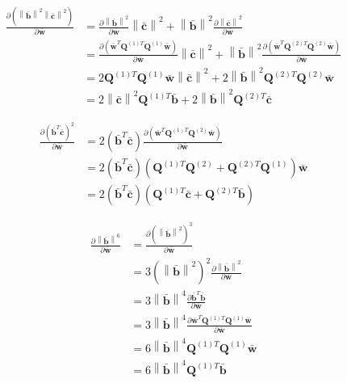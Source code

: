 \begin{align}
\frac{
\partial 
\left(
\left\|\mathbf{\bar{b}}\right\|^2
\left\|\mathbf{\bar{c}}\right\|^2
\right)
}
{\partial \mathbf{\bar{w}}}
&=
\frac{
\partial 
\left\|\mathbf{\bar{b}}\right\|^2
}
{\partial \mathbf{\bar{w}}}
\left\|\mathbf{\bar{c}}\right\|^2
+
\left\|\mathbf{\bar{b}}\right\|^2
\frac{
\partial 
\left\|\mathbf{\bar{c}}\right\|^2
}
{\partial \mathbf{\bar{w}}}\\
~
&=
\frac{
\partial 
\left(
\mathbf{\bar{w}}^{T} \mathbf{Q}^{(1)T}
\mathbf{Q}^{(1)} \mathbf{\bar{w}}
\right)
}
{\partial \mathbf{\bar{w}}}
\left\|\mathbf{\bar{c}}\right\|^2
+
\left\|\mathbf{\bar{b}}\right\|^2
\frac{
\partial 
\left(
\mathbf{\bar{w}}^{T} \mathbf{Q}^{(2)T}
\mathbf{Q}^{(2)} \mathbf{\bar{w}}
\right)
}
{\partial \mathbf{\bar{w}}}\\
~
&=
2
\mathbf{Q}^{(1)T} \mathbf{Q}^{(1)} \mathbf{\bar{w}}
\left\|\mathbf{\bar{c}}\right\|^2
+
2
\left\|\mathbf{\bar{b}}\right\|^2
\mathbf{Q}^{(2)T} \mathbf{Q}^{(2)} \mathbf{\bar{w}}\\
~
&=
2
\left\|\mathbf{\bar{c}}\right\|^2
\mathbf{Q}^{(1)T} \mathbf{\bar{b}}
+
2
\left\|\mathbf{\bar{b}}\right\|^2
\mathbf{Q}^{(2)T} \mathbf{\bar{c}}
\end{align}

\begin{align}
\frac{
\partial
\left(
\mathbf{\bar{b}}^{T}
\mathbf{\bar{c}}
\right)^{2}
}
{\partial \mathbf{\bar{w}}} 
&=
2
\left(
\mathbf{\bar{b}}^{T}
\mathbf{\bar{c}}
\right)
\frac{
\partial
\left(
\mathbf{\bar{w}}^{T} \mathbf{Q}^{(1)T}
\mathbf{Q}^{(2)} \mathbf{\bar{w}}
\right)
}
{\partial \mathbf{\bar{w}}}\\
~
&=
2
\left(
\mathbf{\bar{b}}^{T}
\mathbf{\bar{c}}
\right)
\left(
\mathbf{Q}^{(1)T}\mathbf{Q}^{(2)}
+
\mathbf{Q}^{(2)T}\mathbf{Q}^{(1)}
\right)
\mathbf{\bar{w}}\\
~
&=
2
\left(
\mathbf{\bar{b}}^{T}
\mathbf{\bar{c}}
\right)
\left(
\mathbf{Q}^{(1)T}\mathbf{\bar{c}}
+
\mathbf{Q}^{(2)T}\mathbf{\bar{b}}
\right)
\end{align}


\begin{align}
\frac{
\partial
\left\| \mathbf{\bar{b}} \right\|^{6}
}
{
\partial \mathbf{\bar{w}}
}
&=
\frac{
\partial
\left( \left\| \mathbf{\bar{b}} \right\|^{2} \right)^{3}
}
{
\partial \mathbf{\bar{w}}
}\\
~
&=
3
\left( \left\| \mathbf{\bar{b}} \right\|^{2} \right)^{2}
\frac{
\partial
\left\| \mathbf{\bar{b}} \right\|^{2}
}
{
\partial \mathbf{\bar{w}}
}\\
~
&=
3
\left\| \mathbf{\bar{b}} \right\|^{4}
\frac{
\partial
\mathbf{\bar{b}}^{T}\mathbf{\bar{b}}
}
{
\partial \mathbf{\bar{w}}
}\\
~
&=
3
\left\| \mathbf{\bar{b}} \right\|^{4}
\frac{
\partial
\mathbf{\bar{w}}^{T}\mathbf{Q}^{(1)T}\mathbf{Q}^{(1)}\mathbf{\bar{w}}
}
{
\partial \mathbf{\bar{w}}
}\\
~
&=
6
\left\| \mathbf{\bar{b}} \right\|^{4}
\mathbf{Q}^{(1)T}\mathbf{Q}^{(1)}\mathbf{\bar{w}}\\
~
&=
6
\left\| \mathbf{\bar{b}} \right\|^{4}
\mathbf{Q}^{(1)T}\mathbf{\bar{b}}
\end{align}

